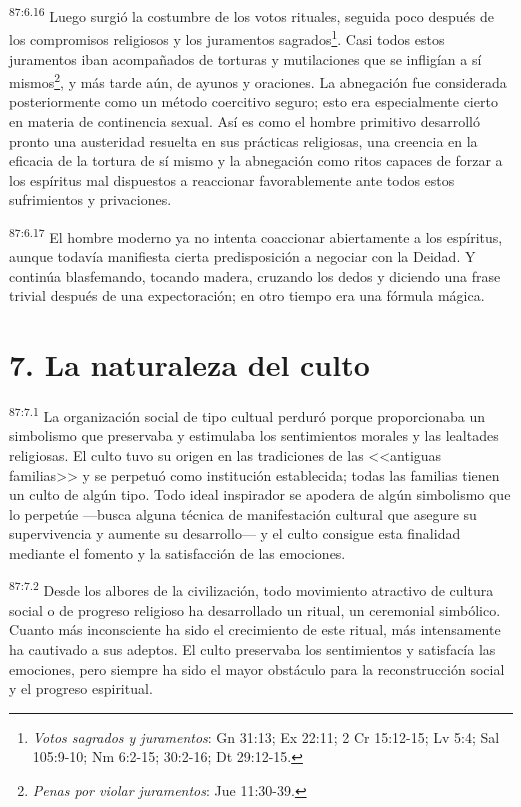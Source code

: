\par
\textsuperscript{87:6.16} Luego surgió la costumbre de los votos rituales, seguida poco después de los compromisos religiosos y los juramentos sagrados\footnote{\textit{Votos sagrados y juramentos}: Gn 31:13; Ex 22:11; 2 Cr 15:12-15; Lv 5:4; Sal 105:9-10; Nm 6:2-15; 30:2-16; Dt 29:12-15.}. Casi todos estos juramentos iban acompañados de torturas y mutilaciones que se infligían a sí mismos\footnote{\textit{Penas por violar juramentos}: Jue 11:30-39.}, y más tarde aún, de ayunos y oraciones. La abnegación fue considerada posteriormente como un método coercitivo seguro; esto era especialmente cierto en materia de continencia sexual. Así es como el hombre primitivo desarrolló pronto una austeridad resuelta en sus prácticas religiosas, una creencia en la eficacia de la tortura de sí mismo y la abnegación como ritos capaces de forzar a los espíritus mal dispuestos a reaccionar favorablemente ante todos estos sufrimientos y privaciones.

\par
\textsuperscript{87:6.17} El hombre moderno ya no intenta coaccionar abiertamente a los espíritus, aunque todavía manifiesta cierta predisposición a negociar con la Deidad. Y continúa blasfemando, tocando madera, cruzando los dedos y diciendo una frase trivial después de una expectoración; en otro tiempo era una fórmula mágica.

\section*{7. La naturaleza del culto}
\par
\textsuperscript{87:7.1} La organización social de tipo cultual perduró porque proporcionaba un simbolismo que preservaba y estimulaba los sentimientos morales y las lealtades religiosas. El culto tuvo su origen en las tradiciones de las <<antiguas familias>> y se perpetuó como institución establecida; todas las familias tienen un culto de algún tipo. Todo ideal inspirador se apodera de algún simbolismo que lo perpetúe ---busca alguna técnica de manifestación cultural que asegure su supervivencia y aumente su desarrollo--- y el culto consigue esta finalidad mediante el fomento y la satisfacción de las emociones.

\par
\textsuperscript{87:7.2} Desde los albores de la civilización, todo movimiento atractivo de cultura social o de progreso religioso ha desarrollado un ritual, un ceremonial simbólico. Cuanto más inconsciente ha sido el crecimiento de este ritual, más intensamente ha cautivado a sus adeptos. El culto preservaba los sentimientos y satisfacía las emociones, pero siempre ha sido el mayor obstáculo para la reconstrucción social y el progreso espiritual.

